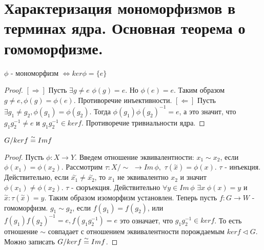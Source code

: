 \section{Характеризация мономорфизмов в терминах ядра. Основная теорема о гомоморфизме.}

\begin{thm}
$ \phi $ - мономорфизм $ \Leftrightarrow ker \phi = \{e\} $
\end{thm}
\begin{proof}
  $ [\Rightarrow] $ Пусть $ \exists g \ne e $ $ \phi(g) = e $. Но $ \phi(e) = e $. Таким образом $ g \ne e, \phi(g) = \phi(e) $. 
  Противоречие инъективности. \newline
  $ [\Leftarrow] $ Пусть $ \exists g_{1} \ne g_{2}, \phi(g_{1}) = \phi(g_{2}) $. Тогда $ \phi(g_{1})\phi(g_{2})^{-1} = e $,
  а это значит, что $ g_{1}g_{2}^{-1} \ne e $ и $ g_{1}g_{2}^{-1} \in ker f $. Противоречие тривиальности ядра. 
\end{proof}

\begin{thm}
  $ G/ker f \buildrel{\sim}\over{=} Im f $
\end{thm}
\begin{proof}
  Пусть $ \phi : X \rightarrow Y $. Введем отношение эквивалентности: $ x_1 \sim x_2 $, если $ \phi(x_1) = \phi(x_2) $. 
  Рассмотрим $ \tau : X/\!\!\!\sim  $ $ \rightarrow Im \, \phi, $ $ \tau(\overset\sim{x}) = \phi(x). $ \newline
  $ \tau $ - инъекция. Действительно, если $ \overset\sim{x_1} \ne \overset\sim{x_2} $, то $ x_1 $ не эквивалентно $ x_2 $
  и значит $ \phi(x_1) \ne \phi(x_2) $. \newline
  $ \tau $ - сюръекция. Действительно $ \forall y \in Im \, \phi $ $ \exists x \; \phi(x) = y $ и 
  $ \overset\sim{x} : \tau(\overset\sim{x}) = y $. Таким образом изоморфизм установлен. \newline
  Теперь пусть $ f : G \rightarrow W $ - гомоморфизм. $ g_1 \sim g_2 $, если $ f(g_1) = f(g_2) $, или 
  $ f(g_1)f(g_2)^{-1} = e, f(g_1g_2^{-1}) = e $ это означает, что $ g_1g_2^{-1} \in ker f $. То есть отношение $ \sim $
  совпадает с отношением эквивалентности порождаемым $ ker f \triangleleft G $. Можно записать
  $ G/ker f \buildrel{\sim}\over{=} Im f $.
\end{proof}



